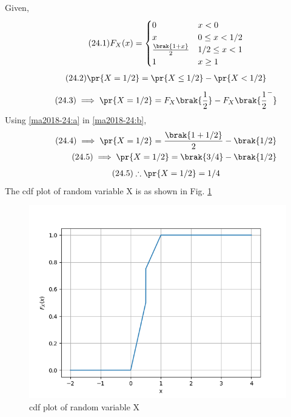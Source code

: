
Given,
\begin{align}
\tag{24.1}
    F_{X}(x)=\begin{cases} 
            0  &  x<0\\
            x &  0 \le x <1/2\\
            \frac{\brak{1+x}}{2} &  1/2 \le x <1\\
            1  &  x\ge 1
            \end{cases} \label{ma2018-24:a}
\end{align}
\begin{align}
\tag{24.2}
    \pr{X=1/2}=\pr{X\leq 1/2}-\pr{X<1/2} 
\end{align}
\begin{align}
\tag{24.3}
    \implies \pr{X=1/2}=F_{X}\brak{\frac{1}{2}}-F_{X}\brak{\frac{1}{2}^-} \label{ma2018-24:b}
\end{align}
 Using \eqref{ma2018-24:a} in \eqref{ma2018-24:b},
\begin{align}
\tag{24.4}
    \implies \pr{X=1/2}=\frac{\brak{1+1/2}}{2}-\brak{1/2}\\
\tag{24.5}
    \implies \pr{X=1/2}=\brak{3/4}-\brak{1/2}
\end{align}
\begin{align}
\tag{24.5}
    \therefore \pr{X=1/2}=1/4
\end{align}
The cdf plot of random variable X is as shown in Fig. \ref{ma2018-24:cdf_plot}\\
\begin{figure}[t!]
    \centering
    \includegraphics[width=\columnwidth]{solutions/ma/2018/24/cdf_plot.png}
    \caption{cdf plot of random variable X}
    \label{ma2018-24:cdf_plot}
\end{figure}
